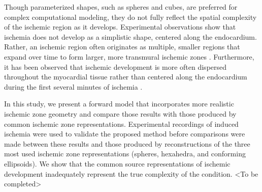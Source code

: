 Though parameterized shapes, such as spheres and cubes, are preferred for complex computational modeling, they do not fully reflect the spatial complexity of the ischemic region as it develops.  Experimental observations show that ischemia does not develop as a simplistic shape, centered along the endocardium.  Rather, an ischemic region often originates as multiple, smaller regions that expand over time to form larger, more transmural ischemic zones \cite{KKA:Jen75,KKA:Ste77,BMB:Ara2015}.  Furthermore, it has been observed that ischemic development is more often dispersed throughout the myocardial tissue rather than centered along the endocardium during the first several minutes of ischemia \cite{BMB:Ara2015}.

In this study, we present a forward model that incorporates more realistic ischemic zone geometry and compare those results with those produced by common ischemic zone representations.  Experimental recordings of induced ischemia were used to validate the proposed method before comparisons were made between these results and those produced by reconstructions of the three most used ischemic zone representations  (spheres, hexahedra, and conforming ellipsoids). 
We show that the common source representations of ischemic development inadequately represent the true complexity of the condition. <To be completed>



